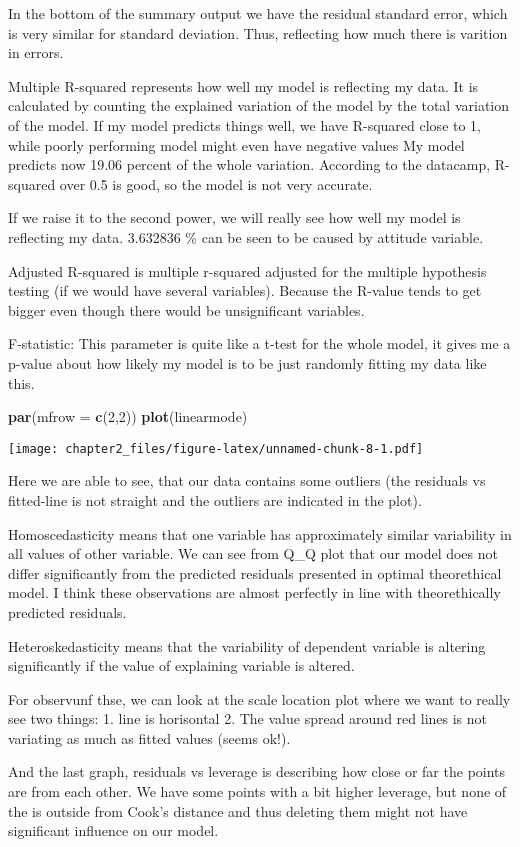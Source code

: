 \documentclass[
]{article}
\newenvironment{Shaded}{\begin{snugshade}}{\end{snugshade}}
\newcommand{\DataTypeTok}[1]{\textcolor[rgb]{0.13,0.29,0.53}{#1}}
\newcommand{\DecValTok}[1]{\textcolor[rgb]{0.00,0.00,0.81}{#1}}
\newcommand{\KeywordTok}[1]{\textcolor[rgb]{0.13,0.29,0.53}{\textbf{#1}}}
\newcommand{\NormalTok}[1]{#1}
\begin{document}
In the bottom of the summary output we have the residual standard error,
which is very similar for standard deviation. Thus, reflecting how much
there is varition in errors.

Multiple R-squared represents how well my model is reflecting my data.
It is calculated by counting the explained variation of the model by the
total variation of the model. If my model predicts things well, we have
R-squared close to 1, while poorly performing model might even have
negative values My model predicts now 19.06 percent of the whole
variation. According to the datacamp, R-squared over 0.5 is good, so the
model is not very accurate.

If we raise it to the second power, we will really see how well my model
is reflecting my data. 3.632836 \% can be seen to be caused by attitude
variable.

Adjusted R-squared is multiple r-squared adjusted for the multiple
hypothesis testing (if we would have several variables). Because the
R-value tends to get bigger even though there would be unsignificant
variables.

F-statistic: This parameter is quite like a t-test for the whole model,
it gives me a p-value about how likely my model is to be just randomly
fitting my data like this.

\begin{Shaded}
\begin{Highlighting}[]
\KeywordTok{par}\NormalTok{(}\DataTypeTok{mfrow =} \KeywordTok{c}\NormalTok{(}\DecValTok{2}\NormalTok{,}\DecValTok{2}\NormalTok{))}
\KeywordTok{plot}\NormalTok{(linearmode)}
\end{Highlighting}
\end{Shaded}

\texttt{[image: chapter2\_files/figure-latex/unnamed-chunk-8-1.pdf]}

Here we are able to see, that our data contains some outliers (the
residuals vs fitted-line is not straight and the outliers are indicated
in the plot).

Homoscedasticity means that one variable has approximately similar
variability in all values of other variable. We can see from Q\_Q plot
that our model does not differ significantly from the predicted
residuals presented in optimal theorethical model. I think these
observations are almost perfectly in line with theorethically predicted
residuals.

Heteroskedasticity means that the variability of dependent variable is
altering significantly if the value of explaining variable is altered.

For observunf thse, we can look at the scale location plot where we want
to really see two things: 1. line is horisontal 2. The value spread
around red lines is not variating as much as fitted values (seems ok!).

And the last graph, residuals vs leverage is describing how close or far
the points are from each other. We have some points with a bit higher
leverage, but none of the is outside from Cook's distance and thus
deleting them might not have significant influence on our model.
\end{document}
